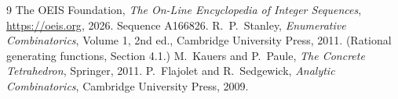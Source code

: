 \documentclass[11pt,a4paper]{article}
\theoremstyle{plain}
\theoremstyle{definition}
\begin{document}
\begin{thebibliography}{9}
 The OEIS Foundation, \emph{The On-Line Encyclopedia of Integer
Sequences}, \url{https://oeis.org}, 2026. Sequence A166826.
 R.~P.~Stanley, \emph{Enumerative Combinatorics}, Volume 1, 2nd ed.,
Cambridge University Press, 2011. (Rational generating functions, Section 4.1.)
 M.~Kauers and P.~Paule, \emph{The Concrete Tetrahedron}, Springer, 2011.
 P.~Flajolet and R.~Sedgewick, \emph{Analytic Combinatorics}, Cambridge
University Press, 2009.
\end{thebibliography}
\end{document}
